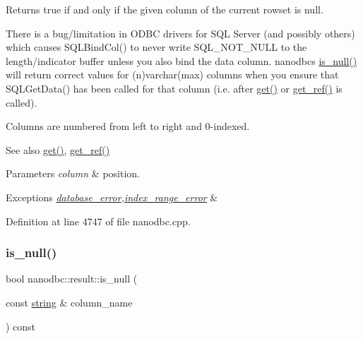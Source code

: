 Returns true if and only if the given column of the current rowset is null. 

There is a bug/limitation in O\+D\+BC drivers for S\+QL Server (and possibly others) which causes S\+Q\+L\+Bind\+Col() to never write S\+Q\+L\+\_\+\+N\+O\+T\+\_\+\+N\+U\+LL to the length/indicator buffer unless you also bind the data column. nanodbc\textquotesingle{}s \mbox{\hyperlink{classnanodbc_1_1result_a85462f6eaed91a5b03739319bd2712e7}{is\+\_\+null()}} will return correct values for (n)varchar(max) columns when you ensure that S\+Q\+L\+Get\+Data() has been called for that column (i.\+e. after \mbox{\hyperlink{classnanodbc_1_1result_affa949e32147a8f262d066a790651ad7}{get()}} or \mbox{\hyperlink{classnanodbc_1_1result_ad606b9ccfa02d6dbdae7a28c7a92bb14}{get\+\_\+ref()}} is called).

Columns are numbered from left to right and 0-\/indexed. \begin{DoxySeeAlso}{See also}
\mbox{\hyperlink{classnanodbc_1_1result_affa949e32147a8f262d066a790651ad7}{get()}}, \mbox{\hyperlink{classnanodbc_1_1result_ad606b9ccfa02d6dbdae7a28c7a92bb14}{get\+\_\+ref()}} 
\end{DoxySeeAlso}

\begin{DoxyParams}{Parameters}
{\em column} & position. \\
\hline
\end{DoxyParams}

\begin{DoxyExceptions}{Exceptions}
{\em \mbox{\hyperlink{classnanodbc_1_1database__error}{database\+\_\+error}},\mbox{\hyperlink{classnanodbc_1_1index__range__error}{index\+\_\+range\+\_\+error}}} & \\
\hline
\end{DoxyExceptions}


Definition at line 4747 of file nanodbc.\+cpp.

\mbox{\label{classnanodbc_1_1result_a9201ef6814bf934ffb9caa7b62f3bad9}} 
\subsubsection{\texorpdfstring{is\_null()}{is\_null()}\hspace{0.1cm}{\footnotesize\ttfamily [2/2]}}
{\footnotesize\ttfamily bool nanodbc\+::result\+::is\+\_\+null (\begin{DoxyParamCaption}\item[{const \mbox{\hyperlink{namespacenanodbc_abfc0ece56278e590911ec8352774c212}{string}} \&}]{column\+\_\+name }\end{DoxyParamCaption}) const}



